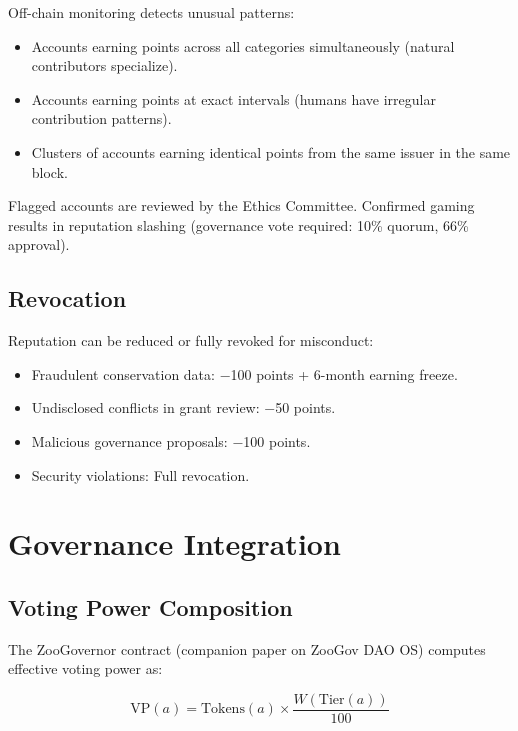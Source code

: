 \documentclass[11pt,letterpaper]{article}
\begin{document}
Off-chain monitoring detects unusual patterns:
\begin{itemize}
    \item Accounts earning points across all categories simultaneously (natural contributors specialize).
    \item Accounts earning points at exact intervals (humans have irregular contribution patterns).
    \item Clusters of accounts earning identical points from the same issuer in the same block.
\end{itemize}

Flagged accounts are reviewed by the Ethics Committee. Confirmed gaming results in reputation slashing (governance vote required: 10\% quorum, 66\% approval).

\subsection{Revocation}

Reputation can be reduced or fully revoked for misconduct:
\begin{itemize}
    \item Fraudulent conservation data: $-$100 points + 6-month earning freeze.
    \item Undisclosed conflicts in grant review: $-$50 points.
    \item Malicious governance proposals: $-$100 points.
    \item Security violations: Full revocation.
\end{itemize}

\section{Governance Integration}
\label{sec:governance}

\subsection{Voting Power Composition}

The ZooGovernor contract (companion paper on ZooGov DAO OS) computes effective voting power as:

\begin{equation}
    \text{VP}(a) = \text{Tokens}(a) \times \frac{W(\text{Tier}(a))}{100}
\end{equation}
\end{document}
